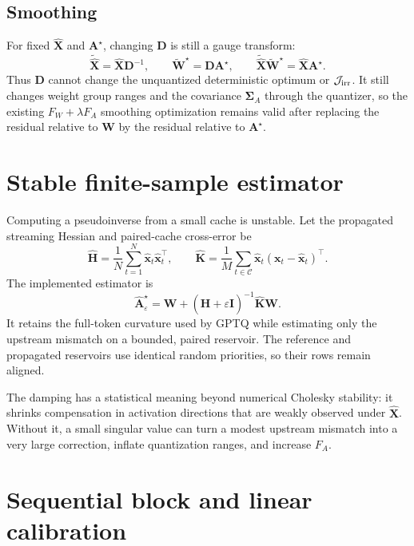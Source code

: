 \documentclass[11pt]{article}
\newcommand{\Xh}{\widehat{\bm X}}
\newcommand{\W}{\bm W}
\newcommand{\D}{\bm D}
\newcommand{\SigA}{\bm\Sigma_A}
\begin{document}
\subsection{Smoothing}

For fixed $\Xh$ and $\bm A^\star$, changing $\D$ is still a gauge transform:
\[
  \widetilde{\Xh}=\Xh\D^{-1},\qquad
  \widetilde{\W}^{\star}=\D\bm A^\star,\qquad
  \widetilde{\Xh}\widetilde{\W}^{\star}=\Xh\bm A^\star.
\]
Thus $\D$ cannot change the unquantized deterministic optimum or
$\mathcal J_{\rm irr}$.  It still changes weight group ranges and the covariance
$\SigA$ through the quantizer, so the existing $F_W+\lambda F_A$ smoothing
optimization remains valid after replacing the residual relative to $\W$ by
the residual relative to $\bm A^\star$.

\section{Stable finite-sample estimator}

Computing a pseudoinverse from a small cache is unstable.  Let the propagated
streaming Hessian and paired-cache cross-error be
\[
  \widehat{\bm H}=\frac{1}{N}\sum_{t=1}^N\widehat{\bm x}_t
    \widehat{\bm x}_t^\top,
  \qquad
  \widehat{\bm K}=\frac{1}{M}\sum_{t\in\mathcal C}
    \widehat{\bm x}_t(\bm x_t-\widehat{\bm x}_t)^\top.
\]
The implemented estimator is
\begin{equation}\label{eq:estimator}
  \boxed{
  \widehat{\bm A}^{\star}_\varepsilon
  =\W+(\widehat{\bm H}+\varepsilon\bm I)^{-1}
    \widehat{\bm K}\W .}
\end{equation}
It retains the full-token curvature used by GPTQ while estimating only the
upstream mismatch on a bounded, paired reservoir.  The reference and propagated
reservoirs use identical random priorities, so their rows remain aligned.

The damping has a statistical meaning beyond numerical Cholesky stability: it
shrinks compensation in activation directions that are weakly observed under
$\Xh$.  Without it, a small singular value can turn a modest upstream mismatch
into a very large correction, inflate quantization ranges, and increase $F_A$.

\section{Sequential block and linear calibration}
\end{document}
